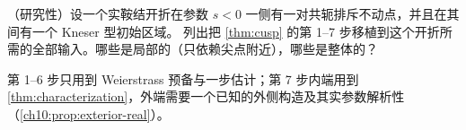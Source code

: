 \begin{exercise}\label{ch10:ex:generalize}
（研究性）设一个实鞍结开折在参数 $s<0$ 一侧有一对共轭排斥不动点，并且在其间有一个 Kneser 型初始区域。
列出把 \cref{thm:cusp} 的第 1--7 步移植到这个开折所需的全部输入。哪些是局部的（只依赖尖点附近），哪些是整体的？
\end{exercise}
\begin{hint}
第 1--6 步只用到 Weierstrass 预备与一步估计；第 7 步内端用到 \cref{thm:characterization}，外端需要一个已知的外侧构造及其实参数解析性（\cref{ch10:prop:exterior-real}）。
\end{hint}
